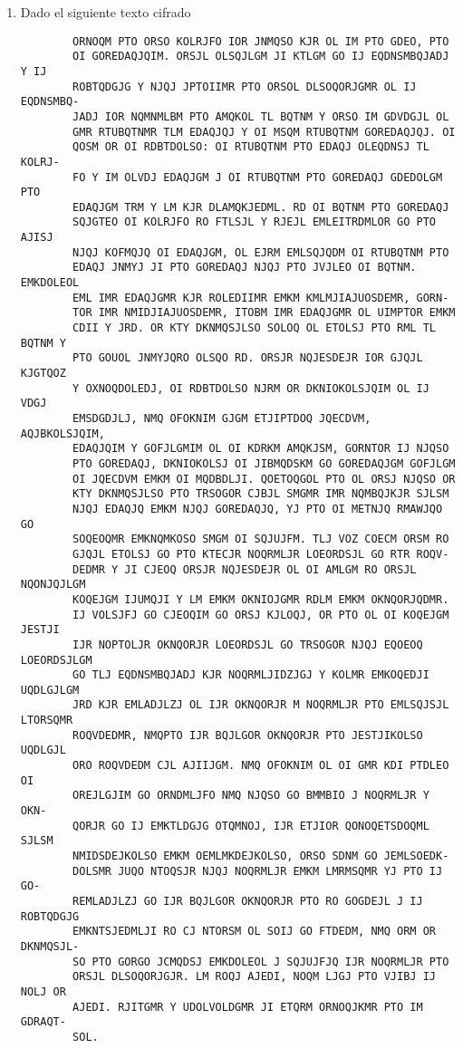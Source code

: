 \documentclass[letterpaper,10pt]{article}
\begin{document}
\begin{enumerate}
    \item Dado el siguiente texto cifrado
    \begin{verbatim}
        ORNOQM PTO ORSO KOLRJFO IOR JNMQSO KJR OL IM PTO GDEO, PTO
        OI GOREDAQJQIM. ORSJL OLSQJLGM JI KTLGM GO IJ EQDNSMBQJADJ Y IJ
        ROBTQDGJG Y NJQJ JPTOIIMR PTO ORSOL DLSOQORJGMR OL IJ EQDNSMBQ-
        JADJ IOR NQMNMLBM PTO AMQKOL TL BQTNM Y ORSO IM GDVDGJL OL
        GMR RTUBQTNMR TLM EDAQJQJ Y OI MSQM RTUBQTNM GOREDAQJQJ. OI
        QOSM OR OI RDBTDOLSO: OI RTUBQTNM PTO EDAQJ OLEQDNSJ TL KOLRJ-
        FO Y IM OLVDJ EDAQJGM J OI RTUBQTNM PTO GOREDAQJ GDEDOLGM PTO
        EDAQJGM TRM Y LM KJR DLAMQKJEDML. RD OI BQTNM PTO GOREDAQJ
        SQJGTEO OI KOLRJFO RO FTLSJL Y RJEJL EMLEITRDMLOR GO PTO AJISJ
        NJQJ KOFMQJQ OI EDAQJGM, OL EJRM EMLSQJQDM OI RTUBQTNM PTO
        EDAQJ JNMYJ JI PTO GOREDAQJ NJQJ PTO JVJLEO OI BQTNM. EMKDOLEOL
        EML IMR EDAQJGMR KJR ROLEDIIMR EMKM KMLMJIAJUOSDEMR, GORN-
        TOR IMR NMIDJIAJUOSDEMR, ITOBM IMR EDAQJGMR OL UIMPTOR EMKM
        CDII Y JRD. OR KTY DKNMQSJLSO SOLOQ OL ETOLSJ PTO RML TL BQTNM Y
        PTO GOUOL JNMYJQRO OLSQO RD. ORSJR NQJESDEJR IOR GJQJL KJGTQOZ
        Y OXNOQDOLEDJ, OI RDBTDOLSO NJRM OR DKNIOKOLSJQIM OL IJ VDGJ
        EMSDGDJLJ, NMQ OFOKNIM GJGM ETJIPTDOQ JQECDVM, AQJBKOLSJQIM,
        EDAQJQIM Y GOFJLGMIM OL OI KDRKM AMQKJSM, GORNTOR IJ NJQSO
        PTO GOREDAQJ, DKNIOKOLSJ OI JIBMQDSKM GO GOREDAQJGM GOFJLGM
        OI JQECDVM EMKM OI MQDBDLJI. QOETOQGOL PTO OL ORSJ NJQSO OR
        KTY DKNMQSJLSO PTO TRSOGOR CJBJL SMGMR IMR NQMBQJKJR SJLSM
        NJQJ EDAQJQ EMKM NJQJ GOREDAQJQ, YJ PTO OI METNJQ RMAWJQO GO
        SOQEOQMR EMKNQMKOSO SMGM OI SQJUJFM. TLJ VOZ COECM ORSM RO
        GJQJL ETOLSJ GO PTO KTECJR NOQRMLJR LOEORDSJL GO RTR ROQV-
        DEDMR Y JI CJEOQ ORSJR NQJESDEJR OL OI AMLGM RO ORSJL NQONJQJLGM
        KOQEJGM IJUMQJI Y LM EMKM OKNIOJGMR RDLM EMKM OKNQORJQDMR.
        IJ VOLSJFJ GO CJEOQIM GO ORSJ KJLOQJ, OR PTO OL OI KOQEJGM JESTJI
        IJR NOPTOLJR OKNQORJR LOEORDSJL GO TRSOGOR NJQJ EQOEOQ LOEORDSJLGM
        GO TLJ EQDNSMBQJADJ KJR NOQRMLJIDZJGJ Y KOLMR EMKOQEDJI UQDLGJLGM
        JRD KJR EMLADJLZJ OL IJR OKNQORJR M NOQRMLJR PTO EMLSQJSJL LTORSQMR
        ROQVDEDMR, NMQPTO IJR BQJLGOR OKNQORJR PTO JESTJIKOLSO UQDLGJL
        ORO ROQVDEDM CJL AJIIJGM. NMQ OFOKNIM OL OI GMR KDI PTDLEO OI
        OREJLGJIM GO ORNDMLJFO NMQ NJQSO GO BMMBIO J NOQRMLJR Y OKN-
        QORJR GO IJ EMKTLDGJG OTQMNOJ, IJR ETJIOR QONOQETSDOQML SJLSM
        NMIDSDEJKOLSO EMKM OEMLMKDEJKOLSO, ORSO SDNM GO JEMLSOEDK-
        DOLSMR JUQO NTOQSJR NJQJ NOQRMLJR EMKM LMRMSQMR YJ PTO IJ GO-
        REMLADJLZJ GO IJR BQJLGOR OKNQORJR PTO RO GOGDEJL J IJ ROBTQDGJG
        EMKNTSJEDMLJI RO CJ NTORSM OL SOIJ GO FTDEDM, NMQ ORM OR DKNMQSJL-
        SO PTO GORGO JCMQDSJ EMKDOLEOL J SQJUJFJQ IJR NOQRMLJR PTO
        ORSJL DLSOQORJGJR. LM ROQJ AJEDI, NOQM LJGJ PTO VJIBJ IJ NOLJ OR
        AJEDI. RJITGMR Y UDOLVOLDGMR JI ETQRM ORNOQJKMR PTO IM GDRAQT-
        SOL.
    \end{verbatim}
    

\end{enumerate}
\end{document}
